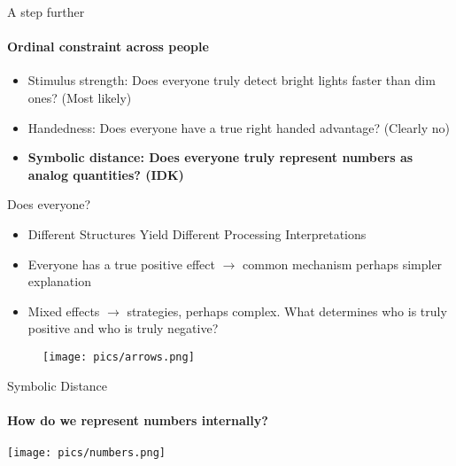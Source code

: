 \documentclass[ignorenonframetext,t]{beamer}
\providecommand{\tightlist}{%
  \setlength{\itemsep}{0pt}\setlength{\parskip}{0pt}}
\begin{document}
\begin{frame}{A step further}

\framesubtitle{Ordinal constraint across people}

\vspace*{1cm}

\begin{itemize}[<+->]
\tightlist
\item
  Stimulus strength: Does everyone truly detect bright lights faster
  than dim ones? (Most likely)
\end{itemize}

\begin{itemize}[<+->]
\tightlist
\item
  Handedness: Does everyone have a true right handed advantage? (Clearly
  no)
\end{itemize}

\begin{itemize}[<+->]
\tightlist
\item
  \textbf{Symbolic distance: Does everyone truly represent numbers as
  analog quantities? (IDK)}
\end{itemize}

\end{frame}

\begin{frame}{Does everyone?}

\vspace*{1cm}

\begin{itemize}[<+->]
\tightlist
\item
  Different Structures Yield Different Processing Interpretations
\item
  Everyone has a true positive effect \(\rightarrow\) common mechanism
  perhaps simpler explanation
\item
  Mixed effects \(\rightarrow\) strategies, perhaps complex. What
  determines who is truly positive and who is truly negative?
\end{itemize}

\vspace*{1.5cm}

\begin{figure}
\hfill
\texttt{[image: pics/arrows.png]}
\end{figure}

\end{frame}

\begin{frame}{Symbolic Distance}

\framesubtitle{How do we represent numbers internally?}

\vspace*{.3cm}

\centering \texttt{[image: pics/numbers.png]}

\end{frame}
\end{document}
